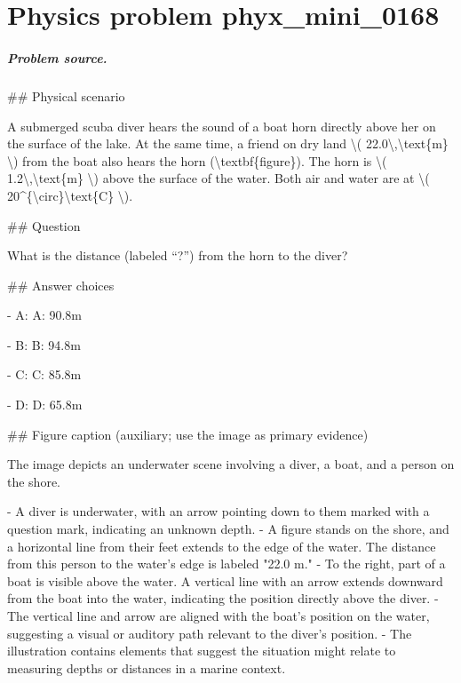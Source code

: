 
\chapter{Physics problem phyx\_mini\_0168}
\label{ch:PhyXMiniProblems_problem_phyx_mini_0168}

\paragraph{Problem source.}
\#\# Physical scenario

A submerged scuba diver hears the sound of a boat horn directly above her on the surface of the lake. At the same time, a friend on dry land \textbackslash{}( 22.0\textbackslash{},\textbackslash{}text\{m\} \textbackslash{}) from the boat also hears the horn (\textbackslash{}textbf\{figure\}). The horn is \textbackslash{}( 1.2\textbackslash{},\textbackslash{}text\{m\} \textbackslash{}) above the surface of the water. Both air and water are at \textbackslash{}( 20\textasciicircum{}\{\textbackslash{}circ\}\textbackslash{}text\{C\} \textbackslash{}).

\#\# Question

What is the distance (labeled “?”) from the horn to the diver?

\#\# Answer choices

- A: A: 90.8m

- B: B: 94.8m

- C: C: 85.8m

- D: D: 65.8m

\#\# Figure caption (auxiliary; use the image as primary evidence)

The image depicts an underwater scene involving a diver, a boat, and a person on the shore. 

- A diver is underwater, with an arrow pointing down to them marked with a question mark, indicating an unknown depth.
- A figure stands on the shore, and a horizontal line from their feet extends to the edge of the water. The distance from this person to the water's edge is labeled "22.0 m."
- To the right, part of a boat is visible above the water. A vertical line with an arrow extends downward from the boat into the water, indicating the position directly above the diver.
- The vertical line and arrow are aligned with the boat's position on the water, suggesting a visual or auditory path relevant to the diver's position.
- The illustration contains elements that suggest the situation might relate to measuring depths or distances in a marine context.

